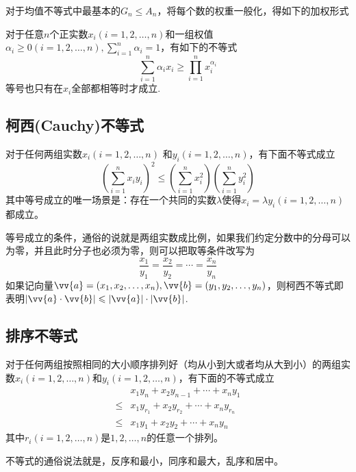 对于均值不等式中最基本的$G_n\leqslant A_n$，将每个数的权重一般化，得如下的加权形式
\begin{theorem}[加权平均值不等式]
  对于任意$n$个正实数$x_{i}(i=1,2,\ldots,n)$和一组权值$\alpha_i\geqslant 0(i=1,2,\ldots,n),\sum_{i=1}^n\alpha_i=1$，有如下的不等式
  \begin{equation}
    \label{eq:mean-inequation-with-weight}
    \sum_{i=1}^n\alpha_ix_i \geqslant \prod_{i=1}^nx_i^{\alpha_i}
  \end{equation}
  等号也只有在$x_i$全部都相等时才成立.
\end{theorem}

\subsection{柯西(Cauchy)不等式}

\begin{theorem}[柯西不等式]
  对于任何两组实数$x_i(i=1,2,\ldots,n)$ 和$y_i(i=1,2,\ldots,n)$，有下面不等式成立
  \begin{equation}
    \label{eq:cauchy-inequation}
    \left( \sum_{i=1}^nx_iy_i \right)^{2} \leqslant \left( \sum_{i=1}^{n}x_i^2 \right) \left( \sum_{i=1}^ny_i^{2} \right)
  \end{equation}
  其中等号成立的唯一场景是：存在一个共同的实数$\lambda$使得$x_i=\lambda y_{i}(i=1,2,\ldots,n)$都成立。
\end{theorem}
等号成立的条件，通俗的说就是两组实数成比例，如果我们约定分数中的分母可以为零，并且此时分子也必须为零，则可以把取等条件改写为
\begin{equation*}
  \frac{x_1}{y_1} = \frac{x_2}{y_2} = \cdots = \frac{x_n}{y_n}
\end{equation*}
如果记向量$\vv{a}=(x_1,x_2,\ldots,x_n), \vv{b}=(y_1,y_2,\ldots,y_n)$，则柯西不等式即表明$|\vv{a} \cdot \vv{b}| \leqslant |\vv{a}| \cdot |\vv{b}|$.

\subsection{排序不等式}

\begin{theorem}[排序不等式]
  对于任何两组按照相同的大小顺序排列好（均从小到大或者均从大到小）的两组实数$x_i(i=1,2,\ldots,n)$和$y_i(i=1,2,\ldots,n)$，有下面的不等式成立
  \begin{eqnarray}
    \label{eq:rearrangement inequality}
    & x_1y_n+x_2y_{n-1}+\cdots+x_ny_1 \nonumber \\
    \leqslant & x_1y_{r_1}+x_2y_{r_2}+\cdots+x_ny_{r_n} \nonumber \\
    \leqslant & x_1y_1+x_2y_2+\cdots+x_ny_n
  \end{eqnarray}
  其中$r_i(i=1,2,\ldots,n)$是$1,2,\ldots,n$的任意一个排列。
\end{theorem}
不等式的通俗说法就是，反序和最小，同序和最大，乱序和居中。

